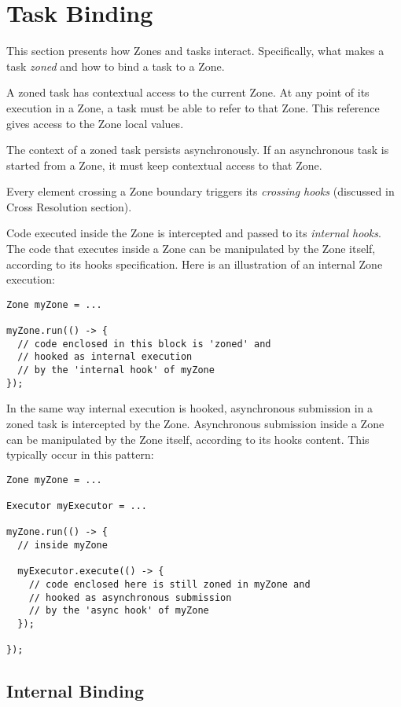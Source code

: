 \section{Task Binding}

This section presents how Zones and tasks interact. Specifically, what makes a task \emph{zoned} and how to bind a task to a Zone.

A zoned task has contextual access to the current Zone. At any point of its execution in a Zone, a task must be able to refer to that Zone. This reference gives
access to the Zone local values.

The context of a zoned task persists asynchronously. If an asynchronous task is started from a Zone, it must keep contextual access to that Zone.

Every element crossing a Zone boundary triggers its \emph{crossing hooks} (discussed in Cross Resolution section).

Code executed inside the Zone is intercepted and passed to its \emph{internal hooks}. The code that executes inside a Zone can be manipulated by the Zone itself, according to its hooks specification. Here is an illustration of an internal Zone execution:

\begin{lstlisting}
Zone myZone = ...

myZone.run(() -> {
  // code enclosed in this block is 'zoned' and
  // hooked as internal execution
  // by the 'internal hook' of myZone
});
\end{lstlisting}

In the same way internal execution is hooked, asynchronous submission in a zoned task is intercepted by the Zone.
Asynchronous submission inside a Zone can be manipulated by the Zone itself, according to its hooks content. This typically occur in this pattern:

\begin{lstlisting}
Zone myZone = ...

Executor myExecutor = ...

myZone.run(() -> {
  // inside myZone

  myExecutor.execute(() -> {
    // code enclosed here is still zoned in myZone and
    // hooked as asynchronous submission
    // by the 'async hook' of myZone
  });
  
});
\end{lstlisting}

\subsection*{Internal Binding}

